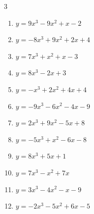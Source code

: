 \begin{multicols}{3}
\begin{enumerate}

  \item $y=9x^{3}-9x^{2}+x-2$


  \item $y=-8x^{3}+9x^{2}+2x+4$


  \item $y=7x^{3}+x^{2}+x-3$


  \item $y=8x^{3}-2x+3$


  \item $y=-x^{3}+2x^{2}+4x+4$


  \item $y=-9x^{3}-6x^{2}-4x-9$


  \item $y=2x^{3}+9x^{2}-5x+8$


  \item $y=-5x^{3}+x^{2}-6x-8$


  \item $y=8x^{3}+5x+1$


  \item $y=7x^{3}-x^{2}+7x$


  \item $y=3x^{3}-4x^{2}-x-9$


\columnbreak %

  \item $y=-2x^{3}-5x^{2}+6x-5$



\end{enumerate}
\end{multicols}
